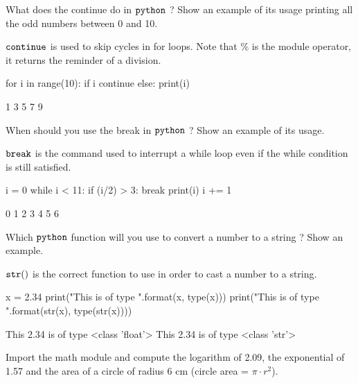 \begin{question}
What does the continue do in \(\tt{python}\) ? Show an example of its usage printing all the odd numbers between 0 and 10.
\end{question}

\cprotEnv \begin{solution}
\(\tt{continue}\) is used to skip cycles in for loops. Note that \% is the module operator, it returns the reminder of a division.

\begin{ipython}
for i in range(10):
    if i%
        continue
    else:
        print(i)

1
3
5
7
9
\end{ipython}
\end{solution}

\begin{question}
When should you use the break in \(\tt{python}\) ? Show an example of its usage.
\end{question}

\cprotEnv \begin{solution}
\(\tt{break}\) is the command used to interrupt a while loop even if the while condition is still satisfied.

\begin{ipython}
i = 0
while i < 11:
    if (i/2) > 3:
        break
    print(i)
    i += 1 

0
1
2
3
4
5
6
\end{ipython}
\end{solution}

\begin{question}
Which \(\tt{python}\) function will you use to convert a number to a string ? Show an example.
\end{question}

\cprotEnv \begin{solution}
\(\tt{str()}\) is the correct function to use in order to cast a number to a string.

\begin{ipython}
x = 2.34
print("This {} is of type {}".format(x, type(x)))
print("This {} is of type {}".format(str(x), type(str(x))))

This 2.34 is of type <class 'float'>
This 2.34 is of type <class 'str'>
\end{ipython}
\end{solution}

\begin{question}
Import the math module and compute the logarithm of 2.09, the exponential of 1.57 and the area of a circle of radius 6 cm (circle area = $\pi \cdot r^2$).
\end{question}

